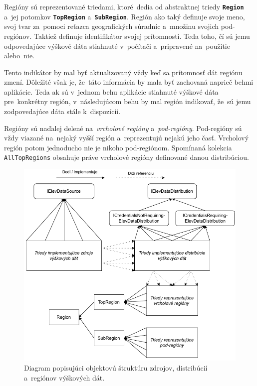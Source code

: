 Regióny sú reprezentované triedami, ktoré~dedia od abstraktnej triedy \textbf{\texttt{Region}} a~jej potomkov \textbf{\texttt{TopRegion}} a~\textbf{\texttt{SubRegion}}. Región ako taký definuje svoje meno, svoj tvar za~pomoci reťazca geografických súradníc a~množinu svojich pod-regiónov. Taktiež definuje identifikátor svojej prítomnosti. Teda toho, čí sú jemu odpovedajúce výškové dáta stiahnuté v~počítači a~pripravené na~použitie alebo~nie.

Tento indikátor by mal byť aktualizovaný vždy keď sa prítomnosť dát regiónu zmení. Dôležité však je, že~táto informácia by mala byť zachovaná naprieč behmi aplikácie. Teda ak sú v~jednom behu aplikácie stiahnuté výškové dáta pre~konkrétny región, v~následujúcom behu by mal región indikovať, že~sú jemu zodpovedajúce dáta stále k~dispozícii.

Regióny sú naďalej delené na~\textit{vrcholové regióny} a~\textit{pod-regióny}. Pod-regióny sú vždy viazané na~nejaký vyšší región a~reprezentujú nejakú jeho časť. Vrcholový región potom jednoducho nie je nikoho pod-regiónom. Spomínaná kolekcia \texttt{AllTopRegions} obsahuje práve vrcholové regióny definované danou distribúciou.    


\begin{figure}[h]\centering
\includegraphics[]{img/vyskove_data_architektura}
\caption{Diagram popisujúci objektovú štruktúru zdrojov, distribúcií a~regiónov výškových dát.} 
\label{obr10:vyskove_data_architektura}
\end{figure}

